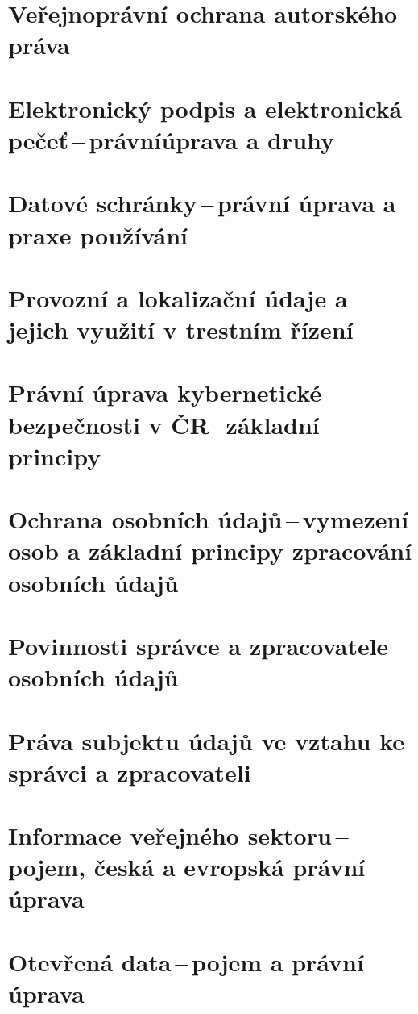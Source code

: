 \section{Veřejnoprávní ochrana autorského práva}

\newpage
\section[Elektronický podpis a elektronická pečeť\,--\,právní úprava a druhy]{Elektronický podpis a elektronická pečeť\,--\,právní\newline úprava a druhy}

\newpage
\section{Datové schránky\,--\,právní úprava a praxe používání}

\newpage
\section{Provozní a lokalizační údaje a jejich využití v trestním řízení}

\newpage
\section[Právní úprava kybernetické bezpečnosti v ČR\,--\,základní principy]{Právní úprava kybernetické bezpečnosti v ČR\,--\newline základní principy}

\newpage
\section{Ochrana osobních údajů\,--\,vymezení osob a základní principy zpracování osobních údajů}

\newpage
\section{Povinnosti správce a zpracovatele osobních údajů}

\newpage
\section{Práva subjektu údajů ve vztahu ke správci a zpracovateli}

\newpage
\section{Informace veřejného sektoru\,--\,pojem, česká a evropská právní úprava}

\newpage
\section{Otevřená data\,--\,pojem a právní úprava}